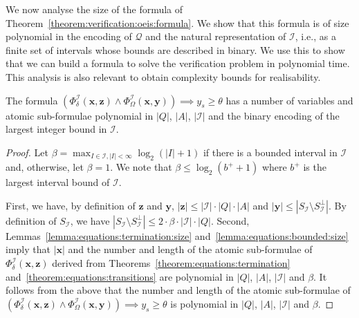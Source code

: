 \documentclass[a4paper,UKenglish,cleveref,autoref,thm-restate,colorlinks]{lipics-v2021}
\newcommand{\mdpStateSpace}{S}
\newcommand{\ocmdp}{\mathcal{Q}}
\newcommand{\ocStateSpace}{Q}
\newcommand{\ocConfig}{s}
\newcommand{\ocActionSpace}{A}
\newcommand{\ocTrans}{\delta}
\newcommand{\intPart}{\mathcal{I}}
\newcommand{\interval}{I}
\newcommand{\intBound}{b}
\newcommand{\intUB}{\intBound^+}
\newcommand{\powerMax}{\beta}
\newcommand{\compressChainStateSpace}{\mdpStateSpace_{\intPart}}
\newcommand{\compressChainStateSpaceStar}{\mdpStateSpace_{\intPart}^{\bot}}
\newcommand{\varTrans}{x}
\newcommand{\varTransTuple}{\mathbf{\varTrans}}
\newcommand{\varObj}{y}
\newcommand{\varObjTuple}{\mathbf{\varObj}}
\newcommand{\varStrat}{z}
\newcommand{\varStratTuple}{\mathbf{\varStrat}}
\newcommand{\formulaTransBase}{\Phi_{\ocTrans}}
\newcommand{\formulaObjBase}{\Phi_{\objective}}
\newcommand{\formulaTrans}{\formulaTransBase^\intPart}
\newcommand{\formulaObj}{\formulaObjBase^\intPart}
\newcommand{\objective}{\Omega}
\newcommand{\thresProba}{\theta}
\begin{document}
We now analyse the size of the formula of Theorem~\ref{theorem:verification:oeis:formula}.
We show that this formula is of size polynomial in the encoding of $\ocmdp$ and the natural representation of $\intPart$, i.e., as a finite set of intervals whose bounds are described in binary.
We use this to show that we can build a formula to solve the verification problem in polynomial time.
This analysis is also relevant to obtain complexity bounds for realisability.
\begin{lemma}\label{lemma:verification:oeis:formula:size}
  The formula $(\formulaTrans(\varTransTuple,\varStratTuple)\land\formulaObj(\varTransTuple, \varObjTuple))\implies \varObj_\ocConfig\geq\thresProba$ has a number of variables and atomic sub-formulae polynomial in $|\ocStateSpace|$, $|\ocActionSpace|$, $|\intPart|$ and the binary encoding of the largest integer bound in $\intPart$.
\end{lemma}
\begin{proof}
    Let $\powerMax=\max_{\interval\in\intPart, |\interval|<\infty}\log_2(|\interval|+1)$ if there is a bounded interval in $\intPart$ and, otherwise, let $\powerMax=1$.
  We note that $\powerMax\leq\log_2(\intUB + 1)$ where $\intUB$ is the largest interval bound of $\intPart$.
  
  First, we have, by definition of $\varStratTuple$ and $\varObjTuple$, $|\varStratTuple|\leq|\intPart|\cdot|\ocStateSpace|\cdot|\ocActionSpace|$ and $|\varObjTuple|\leq |\compressChainStateSpace\setminus\compressChainStateSpaceStar|$.
  By definition of $\compressChainStateSpace$, we have $|\compressChainStateSpace\setminus\compressChainStateSpaceStar| \leq 2 \cdot\powerMax\cdot|\intPart|\cdot|\ocStateSpace|$.
  Second, Lemmas~\ref{lemma:equations:termination:size} and~\ref{lemma:equations:bounded:size} imply that $|\varTransTuple|$ and the number and length of the atomic sub-formulae of $\formulaTrans(\varTransTuple,\varStratTuple)$ derived from Theorems~\ref{theorem:equations:termination} and~\ref{theorem:equations:transitions} are polynomial in $|\ocStateSpace|$, $|\ocActionSpace|$, $|\intPart|$ and $\powerMax$.
  It follows from the above that the number and length of the atomic sub-formulae of $(\formulaTrans(\varTransTuple,\varStratTuple)\land\formulaObj(\varTransTuple, \varObjTuple))\implies \varObj_\ocConfig\geq\thresProba$ is polynomial in $|\ocStateSpace|$, $|\ocActionSpace|$, $|\intPart|$ and $\powerMax$.
\end{proof}
\end{document}
